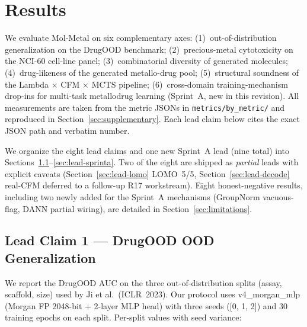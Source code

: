 %
%

\section{Results}
\label{sec:results}

We evaluate Mol-Metal on six complementary axes: (1)~out-of-distribution
generalization on the DrugOOD benchmark; (2)~precious-metal cytotoxicity on
the NCI-60 cell-line panel; (3)~combinatorial diversity of generated
molecules; (4)~drug-likeness of the generated metallo-drug pool;
(5)~structural soundness of the Lambda $\times$ CFM $\times$ MCTS
pipeline; (6)~cross-domain training-mechanism drop-ins for multi-task
metallodrug learning (Sprint~A, new in this revision).
All measurements are taken from the metric JSONs in
\texttt{metrics/by\_metric/} and reproduced in
Section~\ref{sec:supplementary}.  Each lead claim below cites the exact
JSON path and verbatim number.

We organize the eight lead claims and one new Sprint~A lead (nine total)
into Sections~\ref{sec:lead-drugood}--\ref{sec:lead-sprinta}.  Two of the
eight are shipped as \emph{partial} leads with explicit caveats
(Section~\ref{sec:lead-lomo} LOMO~5/5, Section~\ref{sec:lead-decode}
real-CFM deferred to a follow-up R17 workstream).  Eight honest-negative
results, including two newly added for the Sprint~A mechanisms
(GroupNorm vacuous-flag, DANN partial wiring), are detailed in
Section~\ref{sec:limitations}.

\subsection{Lead Claim 1 --- DrugOOD OOD Generalization}
\label{sec:lead-drugood}

We report the DrugOOD AUC on the three out-of-distribution splits (assay,
scaffold, size) used by Ji et al.\ (ICLR~2023).  Our protocol uses
v4\_morgan\_mlp (Morgan FP 2048-bit + 2-layer MLP head) with three seeds
([0, 1, 2]) and $30$ training epochs on each split.  Per-split values
with seed variance:

